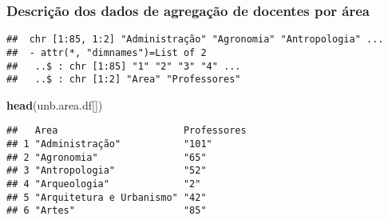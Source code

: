 \documentclass[]{article}
\newenvironment{Shaded}{\begin{snugshade}}{\end{snugshade}}
\newcommand{\KeywordTok}[1]{\textcolor[rgb]{0.13,0.29,0.53}{\textbf{#1}}}
\newcommand{\DataTypeTok}[1]{\textcolor[rgb]{0.13,0.29,0.53}{#1}}
\newcommand{\DecValTok}[1]{\textcolor[rgb]{0.00,0.00,0.81}{#1}}
\newcommand{\StringTok}[1]{\textcolor[rgb]{0.31,0.60,0.02}{#1}}
\newcommand{\ControlFlowTok}[1]{\textcolor[rgb]{0.13,0.29,0.53}{\textbf{#1}}}
\newcommand{\OperatorTok}[1]{\textcolor[rgb]{0.81,0.36,0.00}{\textbf{#1}}}
\newcommand{\NormalTok}[1]{#1}
\begin{document}
\subsubsection{Descrição dos dados de agregação de docentes por
área}\label{descricao-dos-dados-de-agregacao-de-docentes-por-area}

\begin{Shaded}
\end{Shaded}

\begin{verbatim}
##  chr [1:85, 1:2] "Administração" "Agronomia" "Antropologia" ...
##  - attr(*, "dimnames")=List of 2
##   ..$ : chr [1:85] "1" "2" "3" "4" ...
##   ..$ : chr [1:2] "Area" "Professores"
\end{verbatim}

\begin{Shaded}
\begin{Highlighting}[]
\KeywordTok{head}\NormalTok{(unb.area.df[])}
\end{Highlighting}
\end{Shaded}

\begin{verbatim}
##   Area                      Professores
## 1 "Administração"           "101"      
## 2 "Agronomia"               "65"       
## 3 "Antropologia"            "52"       
## 4 "Arqueologia"             "2"        
## 5 "Arquitetura e Urbanismo" "42"       
## 6 "Artes"                   "85"
\end{verbatim}
\end{document}
